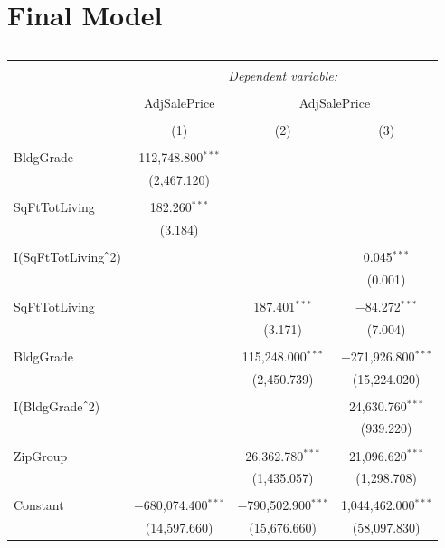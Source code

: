 \documentclass[12pt,letterpaper]{article}
\begin{document}
\section*{Final Model}
\begin{table}[!htbp] \centering 
	\footnotesize
	\caption{} 
	\label{} 
	\begin{tabular}{@{\extracolsep{5pt}}lccc} 
		\\[-1.8ex]\hline 
		\hline \\[-1.8ex] 
		& \multicolumn{3}{c}{\textit{Dependent variable:}} \\ 
		\cline{2-4} 
		\\[-1.8ex] & AdjSalePrice & \multicolumn{2}{c}{AdjSalePrice} \\ 
		\\[-1.8ex] & (1) & (2) & (3)\\ 
		\hline \\[-1.8ex] 
		BldgGrade & 112,748.800$^{***}$ &  &  \\ 
		& (2,467.120) &  &  \\ 
		& & & \\ 
		SqFtTotLiving & 182.260$^{***}$ &  &  \\ 
		& (3.184) &  &  \\ 
		& & & \\ 
		I(SqFtTotLiving$\hat{\mkern6mu}$2) &  &  & 0.045$^{***}$ \\ 
		&  &  & (0.001) \\ 
		& & & \\ 
		SqFtTotLiving &  & 187.401$^{***}$ & $-$84.272$^{***}$ \\ 
		&  & (3.171) & (7.004) \\ 
		& & & \\ 
		BldgGrade &  & 115,248.000$^{***}$ & $-$271,926.800$^{***}$ \\ 
		&  & (2,450.739) & (15,224.020) \\ 
		& & & \\ 
		I(BldgGrade$\hat{\mkern6mu}$2) &  &  & 24,630.760$^{***}$ \\ 
		&  &  & (939.220) \\ 
		& & & \\ 
		ZipGroup &  & 26,362.780$^{***}$ & 21,096.620$^{***}$ \\ 
		&  & (1,435.057) & (1,298.708) \\ 
		& & & \\ 
		Constant & $-$680,074.400$^{***}$ & $-$790,502.900$^{***}$ & 1,044,462.000$^{***}$ \\ 
		& (14,597.660) & (15,676.660) & (58,097.830) \\ 

\end{tabular}
\end{table}
\end{document}
